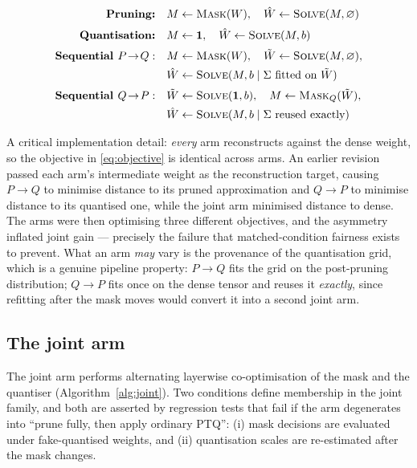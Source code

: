\begin{align}
  \textbf{Pruning:}\quad
    & M \leftarrow \textsc{Mask}(W), \quad
      \hat{W} \leftarrow \textsc{Solve}(M, \varnothing)
    \nonumber \\[2pt]
  \textbf{Quantisation:}\quad
    & M \leftarrow \mathbf{1}, \quad
      \hat{W} \leftarrow \textsc{Solve}(M, b)
    \nonumber \\[2pt]
  \textbf{Sequential } P\!\rightarrow\!Q:\quad
    & M \leftarrow \textsc{Mask}(W), \quad
      \tilde{W} \leftarrow \textsc{Solve}(M, \varnothing),
    \nonumber \\
    & \hat{W} \leftarrow \textsc{Solve}(M, b \mid \Sigma \text{ fitted on } \tilde{W})
    \nonumber \\[2pt]
  \textbf{Sequential } Q\!\rightarrow\!P:\quad
    & \tilde{W} \leftarrow \textsc{Solve}(\mathbf{1}, b), \quad
      M \leftarrow \textsc{Mask}_{Q}(\tilde{W}),
    \nonumber \\
    & \hat{W} \leftarrow \textsc{Solve}(M, b \mid \Sigma \text{ reused exactly})
    \nonumber
\end{align}

A critical implementation detail: \emph{every} arm reconstructs against the dense weight, so
the objective in \eqref{eq:objective} is identical across arms. An earlier revision passed
each arm's intermediate weight as the reconstruction target, causing $P\!\rightarrow\!Q$ to
minimise distance to its pruned approximation and $Q\!\rightarrow\!P$ to minimise distance
to its quantised one, while the joint arm minimised distance to dense. The arms were then
optimising three different objectives, and the asymmetry inflated joint gain --- precisely
the failure that matched-condition fairness exists to prevent. What an arm \emph{may} vary
is the provenance of the quantisation grid, which is a genuine pipeline property:
$P\!\rightarrow\!Q$ fits the grid on the post-pruning distribution; $Q\!\rightarrow\!P$
fits once on the dense tensor and reuses it \emph{exactly}, since refitting after the mask
moves would convert it into a second joint arm.

\subsection{The joint arm}
\label{subsec:joint}

The joint arm performs alternating layerwise co-optimisation of the mask and the quantiser
(Algorithm~\ref{alg:joint}). Two conditions define membership in the joint family, and both
are asserted by regression tests that fail if the arm degenerates into ``prune fully, then
apply ordinary PTQ'': (i) mask decisions are evaluated under fake-quantised weights, and
(ii) quantisation scales are re-estimated after the mask changes.

